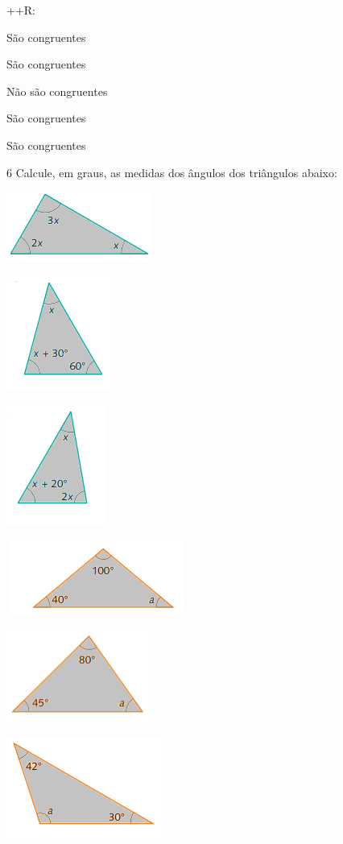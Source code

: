 {++R:
\item São congruentes
\item São congruentes
\item Não são congruentes
\item São congruentes
\item São congruentes

\num{6} Calcule, em graus, as medidas dos ângulos dos triângulos abaixo:
\item
\includegraphics[width=1.86458in,height=0.89583in]{./imgSAEB_8_MAT/media/image24.png}
\item
\includegraphics[width=1.40625in,height=1.47917in]{./imgSAEB_8_MAT/media/image25.png}
\item
\includegraphics[width=1.30208in,height=1.5625in]{./imgSAEB_8_MAT/media/image26.png}
\item
\includegraphics[width=2.33333in,height=0.95833in]{./imgSAEB_8_MAT/media/image27.png}
\item
\includegraphics[width=1.83333in,height=1.1875in]{./imgSAEB_8_MAT/media/image28.png}
\item
\includegraphics[width=2in,height=1.30208in]{./imgSAEB_8_MAT/media/image29.png}


}
